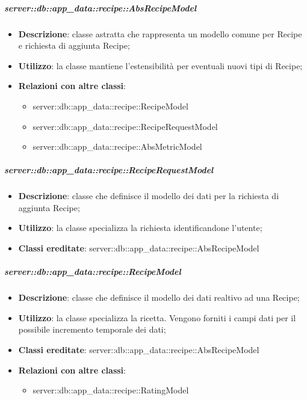 		\subparagraph{server::db::app\_data::recipe::AbsRecipeModel} %
		\label{subp:server_db_app_data_recipe_absrecipemodel}
			\begin{itemize}
				\item \textbf{Descrizione}: classe astratta che rappresenta un modello comune per Recipe e richiesta di aggiunta Recipe;
				\item \textbf{Utilizzo}: la classe mantiene l'estensibilità per eventuali nuovi tipi di Recipe;
				\item \textbf{Relazioni con altre classi}:
					\begin{itemize}
						\item server::db::app\_data::recipe::RecipeModel
						\item server::db::app\_data::recipe::RecipeRequestModel
						\item server::db::app\_data::recipe::AbsMetricModel
					\end{itemize}
			\end{itemize}


		\subparagraph{server::db::app\_data::recipe::RecipeRequestModel} %
		\label{subp:server_db_app_data_recipe_reciperequestmodel}
			\begin{itemize}
				\item \textbf{Descrizione}: classe che definisce il modello dei dati per la richiesta di aggiunta Recipe;
				\item \textbf{Utilizzo}: la classe specializza la richiesta identificandone l'utente;
				\item \textbf{Classi ereditate}: server::db::app\_data::recipe::AbsRecipeModel
			\end{itemize}


		\subparagraph{server::db::app\_data::recipe::RecipeModel} %
		\label{subp:server_db_app_data_recipe_recipemodel}
			\begin{itemize}
				\item \textbf{Descrizione}: classe che definisce il modello dei dati realtivo ad una Recipe;
				\item \textbf{Utilizzo}: la classe specializza la ricetta. Vengono forniti i campi dati per il possibile incremento temporale dei dati;
				\item \textbf{Classi ereditate}: server::db::app\_data::recipe::AbsRecipeModel
				\item \textbf{Relazioni con altre classi}:
					\begin{itemize}
						\item server::db::app\_data::recipe::RatingModel
					\end{itemize}
			\end{itemize}

